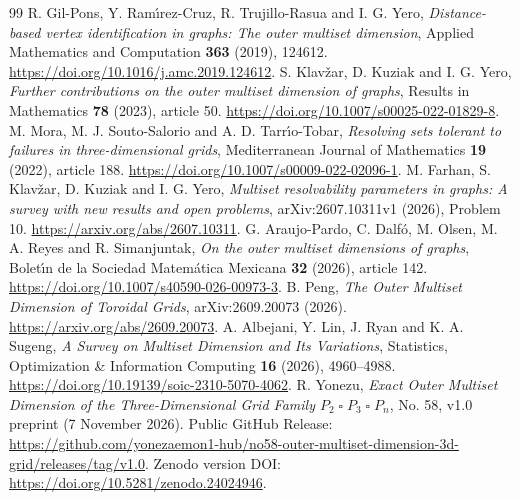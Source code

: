 \documentclass[10pt,a4paper]{article}
\newcommand{\boxp}{\mathbin{\square}}
\begin{document}
\begin{thebibliography}{99}\small
{} R. Gil-Pons, Y. Ram\'{\i}rez-Cruz, R. Trujillo-Rasua and I. G. Yero, \emph{Distance-based vertex identification in graphs: The outer multiset dimension}, Applied Mathematics and Computation \textbf{363} (2019), 124612. \url{https://doi.org/10.1016/j.amc.2019.124612}.
 S. Klav\v{z}ar, D. Kuziak and I. G. Yero, \emph{Further contributions on the outer multiset dimension of graphs}, Results in Mathematics \textbf{78} (2023), article 50. \url{https://doi.org/10.1007/s00025-022-01829-8}.
 M. Mora, M. J. Souto-Salorio and A. D. Tarr\'{\i}o-Tobar, \emph{Resolving sets tolerant to failures in three-dimensional grids}, Mediterranean Journal of Mathematics \textbf{19} (2022), article 188. \url{https://doi.org/10.1007/s00009-022-02096-1}.
 M. Farhan, S. Klav\v{z}ar, D. Kuziak and I. G. Yero, \emph{Multiset resolvability parameters in graphs: A survey with new results and open problems}, arXiv:2607.10311v1 (2026), Problem 10. \url{https://arxiv.org/abs/2607.10311}.
 G. Araujo-Pardo, C. Dalf\'{o}, M. Olsen, M. A. Reyes and R. Simanjuntak, \emph{On the outer multiset dimensions of graphs}, Bolet\'{\i}n de la Sociedad Matem\'{a}tica Mexicana \textbf{32} (2026), article 142. \url{https://doi.org/10.1007/s40590-026-00973-3}.
 B. Peng, \emph{The Outer Multiset Dimension of Toroidal Grids}, arXiv:2609.20073 (2026). \url{https://arxiv.org/abs/2609.20073}.
 A. Albejani, Y. Lin, J. Ryan and K. A. Sugeng, \emph{A Survey on Multiset Dimension and Its Variations}, Statistics, Optimization \& Information Computing \textbf{16} (2026), 4960--4988. \url{https://doi.org/10.19139/soic-2310-5070-4062}.
 R. Yonezu, \emph{Exact Outer Multiset Dimension of the Three-Dimensional Grid Family $P_2\boxp P_3\boxp P_n$}, No. 58, v1.0 preprint (7 November 2026). Public GitHub Release: \url{https://github.com/yonezaemon1-hub/no58-outer-multiset-dimension-3d-grid/releases/tag/v1.0}. Zenodo version DOI: \url{https://doi.org/10.5281/zenodo.24024946}.
\end{thebibliography}
\end{document}
